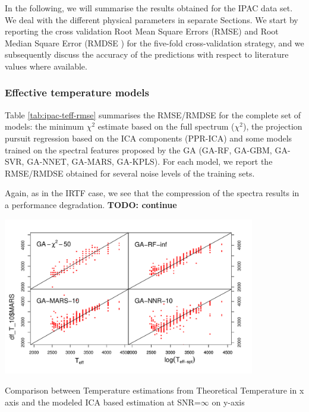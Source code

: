 
In the following, we will summarise the results obtained for the IPAC
data set. We deal with the different physical parameters in separate
Sections. We start by reporting the cross validation Root Mean Square
Errors (RMSE) and Root Median Square Error (RMDSE ) for the five-fold
cross-validation strategy, and we subsequently discuss the accuracy of
the predictions with respect to literature values where available.

\subsubsection{Effective temperature models}

Table \ref{tab:ipac-teff-rmse} summarises the RMSE/RMDSE for the
complete set of models: the minimum $\chi^2$ estimate based on the
full spectrum ($\chi^2$), the projection pursuit regression based on
the ICA components (PPR-ICA) and some models trained on the spectral
features proposed by the GA (GA-RF, GA-GBM, GA-SVR, GA-NNET, GA-MARS,
GA-KPLS). For each model, we report the RMSE/RMDSE obtained for
several noise levels of the training sets.


Again, as in the IRTF case, we see that the compression of the spectra
results in a performance degradation. {\bf TODO: continue} 

\begin {figure*}
 \centering
  \includegraphics[width=11cm]{figs/ipac-teff.pdf}
  \caption{Comparison between Temperature estimations from Theoretical Temperature 
  in x axis and the modeled ICA based estimation at SNR=$\infty$ on y-axis}
 \label{fig:ipac_teff}
\end {figure*}




